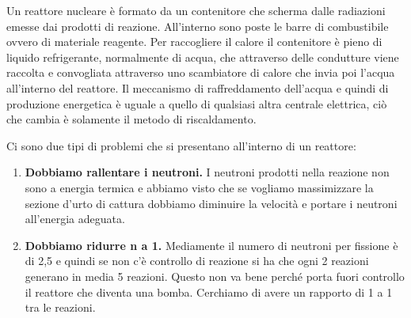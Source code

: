 Un reattore nucleare è formato da un contenitore che scherma dalle radiazioni emesse dai prodotti di reazione.
All'interno sono poste le barre di combustibile ovvero di materiale reagente.
Per raccogliere il calore il contenitore è pieno di liquido refrigerante, normalmente di acqua, che attraverso delle condutture viene raccolta e convogliata attraverso uno scambiatore di calore che invia poi l'acqua all'interno del reattore.
Il meccanismo di raffreddamento dell'acqua e quindi di produzione energetica è uguale a quello di qualsiasi altra centrale elettrica, ciò che cambia è solamente il metodo di riscaldamento.
 
 Ci sono due tipi di problemi che si presentano all'interno di un reattore:
\begin{enumerate}
\item \textbf{Dobbiamo rallentare i neutroni.} 
I neutroni prodotti nella reazione non sono a energia termica e abbiamo visto che se vogliamo massimizzare la sezione d'urto di cattura dobbiamo diminuire la velocità e portare i neutroni all'energia adeguata.
\item \textbf{Dobbiamo ridurre n a 1.} 
Mediamente il numero di neutroni per fissione è di 2,5 e quindi se non c'è controllo di reazione si ha che ogni 2 reazioni generano in media 5 reazioni. 
Questo non va bene perché porta fuori controllo il reattore che diventa una bomba.
Cerchiamo di avere un rapporto di 1 a 1 tra le reazioni.
\end{enumerate}

